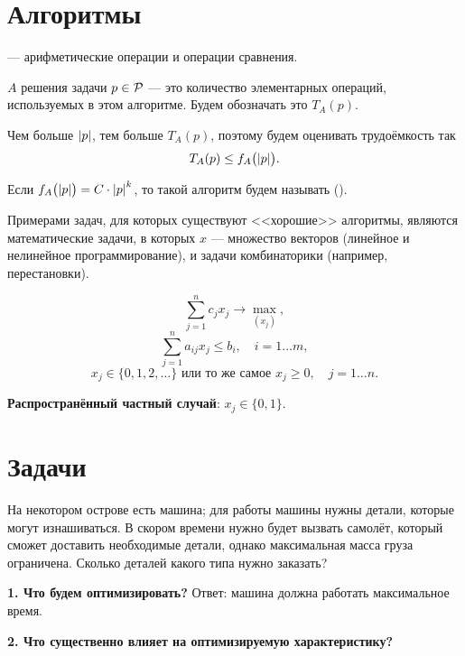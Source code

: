 \section{Алгоритмы}


 --- арифметические операции и операции сравнения.


 $A$ решения задачи $p \in \P$ --- это количество элементарных операций, используемых в этом алгоритме. Будем обозначать это $T_A(p)$.

\remark

Чем больше $\abs{p}$, тем больше $T_A(p)$, поэтому будем оценивать трудоёмкость так
\[
T_A(p) \le f_A\big(\abs{p}\big).
\]


Если $f_A\big(\abs{p}\big) = C \cdot \abs{p}^k$, то такой алгоритм будем называть  ().

Примерами задач, для которых существуют <<хорошие>> алгоритмы, являются математические задачи, в которых $x$ --- множество векторов (линейное и нелинейное программирование), и задачи комбинаторики (например, перестановки).


\[\sum_{j=1}^{n} c_j x_j \to \max_{(x_j)},\]
\[\sum_{j=1}^{n}a_{ij} x_j \le b_i, \quad i = 1\dots m,\]
\[x_j \in \{0, 1, 2, \dots\} \text{ или то же самое } x_j \ge 0, \quad j = 1\dots n.\]

\textbf{Распространённый частный случай}: $x_j \in \{0, 1\}$.

\section{Задачи}


На некотором острове есть машина; для работы машины нужны детали, которые могут изнашиваться. В скором времени нужно будет вызвать самолёт, который сможет доставить необходимые детали, однако максимальная масса груза ограничена. Сколько деталей какого типа нужно заказать?

\textbf{1. Что будем оптимизировать?} Ответ: машина должна работать максимальное время.

\textbf{2. Что существенно влияет на оптимизируемую характеристику?}

